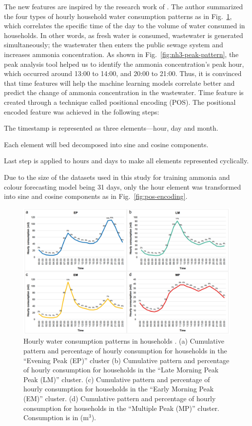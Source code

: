 The new features are inspired by the research work of \citet{abu-bakarQuantifyingImpactCOVID192021}. The author summarized the four types of hourly household water consumption patterns as in Fig.~\ref{fig:water-consumption-pattern}, which correlates the specific time of the day to the volume of water consumed in households. In other words, as fresh water is consumed, wastewater is generated simultaneously; the wastewater then enters the public sewage system and increases ammonia concentration. As shown in Fig.~\ref{fig:nh3-peak-pattern}, the peak analysis tool helped us to identify the ammonia concentration's peak hour, which occurred around 13:00 to 14:00, and 20:00 to 21:00. Thus, it is convinced that time features will help the machine learning models correlate better and predict the change of ammonia concentration in the wastewater. Time feature is created through a technique called positional encoding (POS). The positional encoded feature was achieved in the following steps:

\noindent
\begin{myenumerate}
    \item The timestamp is represented as three elements---hour, day and month.
    \item Each element will bed decomposed into sine and cosine components.
    \item Last step is applied to hours and days to make all elements represented cyclically.
\end{myenumerate}

Due to the size of the datasets used in this study for training ammonia and colour forecasting model being 31 days, only the hour element was transformed into sine and cosine components as in Fig.~\ref{fig:pos-encoding}.

\begin{figure}[!ht]
    \centering
    \includegraphics[width=0.8\columnwidth]{imgs/pre-processing/hourly-consumption-pattern.png}
    \caption{Hourly water consumption patterns in households \citep{abu-bakarQuantifyingImpactCOVID192021}. (a) Cumulative pattern and percentage of hourly consumption for households in the “Evening Peak (EP)” cluster (b) Cumulative pattern and percentage of hourly consumption for households in the “Late Morning Peak Peak (LM)” cluster. (c) Cumulative pattern and percentage of hourly consumption for households in the “Early Morning Peak (EM)” cluster. (d) Cumulative pattern and percentage of hourly consumption for households in the “Multiple Peak (MP)” cluster. Consumption is in (m$^3$).}
    \label{fig:water-consumption-pattern}
 \end{figure}

